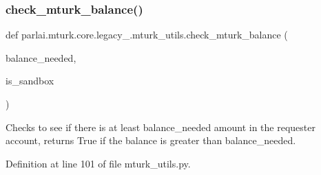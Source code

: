 \subsubsection{\texorpdfstring{check\+\_\+mturk\+\_\+balance()}{check\_mturk\_balance()}}
{\footnotesize\ttfamily def parlai.\+mturk.\+core.\+legacy\+\_.\+mturk\+\_\+utils.\+check\+\_\+mturk\+\_\+balance (\begin{DoxyParamCaption}\item[{}]{balance\+\_\+needed,  }\item[{}]{is\+\_\+sandbox }\end{DoxyParamCaption})}

\begin{DoxyVerb}Checks to see if there is at least balance_needed amount in the requester account,
returns True if the balance is greater than balance_needed.
\end{DoxyVerb}
 

Definition at line 101 of file mturk\+\_\+utils.\+py.


